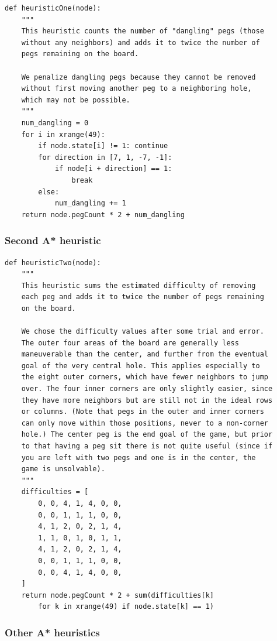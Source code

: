 \documentclass[11pt]{article}
\begin{document}
\lstset{language=Python}
\begin{lstlisting}[frame=single]
def heuristicOne(node):
	"""
	This heuristic counts the number of "dangling" pegs (those
	without any neighbors) and adds it to twice the number of
	pegs remaining on the board.

	We penalize dangling pegs because they cannot be removed
	without first moving another peg to a neighboring hole,
	which may not be possible.
	"""
	num_dangling = 0
	for i in xrange(49):
		if node.state[i] != 1: continue
		for direction in [7, 1, -7, -1]:
			if node[i + direction] == 1:
				break
		else:
			num_dangling += 1
	return node.pegCount * 2 + num_dangling
\end{lstlisting}

\subsubsection{Second A* heuristic}

\lstset{language=Python}
\begin{lstlisting}[frame=single]
def heuristicTwo(node):
	"""
	This heuristic sums the estimated difficulty of removing
	each peg and adds it to twice the number of pegs remaining
	on the board.

	We chose the difficulty values after some trial and error.
	The outer four areas of the board are generally less
	maneuverable than the center, and further from the eventual
	goal of the very central hole. This applies especially to
	the eight outer corners, which have fewer neighbors to jump
	over. The four inner corners are only slightly easier, since
	they have more neighbors but are still not in the ideal rows
	or columns. (Note that pegs in the outer and inner corners
	can only move within those positions, never to a non-corner
	hole.) The center peg is the end goal of the game, but prior
	to that having a peg sit there is not quite useful (since if
	you are left with two pegs and one is in the center, the
	game is unsolvable).
	"""
	difficulties = [
		0, 0, 4, 1, 4, 0, 0,
		0, 0, 1, 1, 1, 0, 0,
		4, 1, 2, 0, 2, 1, 4,
		1, 1, 0, 1, 0, 1, 1,
		4, 1, 2, 0, 2, 1, 4,
		0, 0, 1, 1, 1, 0, 0,
		0, 0, 4, 1, 4, 0, 0,
	]
	return node.pegCount * 2 + sum(difficulties[k]
		for k in xrange(49) if node.state[k] == 1)
\end{lstlisting}

\subsubsection{Other A* heuristics}
\end{document}
